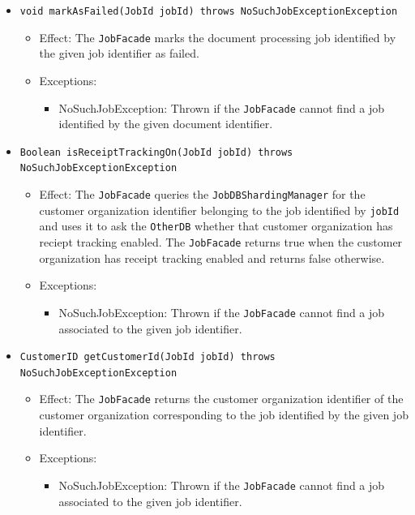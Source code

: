 \documentclass[a4paper,10pt]{article}
\begin{document}
\begin{itemize}
\begin{itemize}
  \item \texttt{void markAsFailed(JobId jobId) throws NoSuchJobExceptionException}
    	\begin{itemize}
    		\item Effect: The \texttt{JobFacade} marks the document processing job identified by the given job identifier as failed.
    		\item Exceptions:
    		\begin{itemize}
    			\item NoSuchJobException: Thrown if the \texttt{JobFacade} cannot find a job identified by the given document identifier.
    		\end{itemize}
    	\end{itemize}     	
    	
    	
    	\item \texttt{Boolean isReceiptTrackingOn(JobId jobId) throws NoSuchJobExceptionException}
    	\begin{itemize}
    		\item Effect: The \texttt{JobFacade} queries the \texttt{JobDBShardingManager} for the customer organization identifier belonging to the job identified by \texttt{jobId} and uses it to ask the \texttt{OtherDB} whether that customer organization has reciept tracking enabled. The \texttt{JobFacade} returns true when the customer organization has receipt tracking enabled and returns false otherwise.
    		\item Exceptions:
    		\begin{itemize}
    			\item NoSuchJobException: Thrown if the \texttt{JobFacade} cannot find a job associated to the given job identifier.
    		\end{itemize}
    	\end{itemize}
 
   	   \item \texttt{CustomerID getCustomerId(JobId jobId) throws NoSuchJobExceptionException}
    	\begin{itemize}
    		\item Effect: The \texttt{JobFacade} returns the customer organization identifier of the customer organization corresponding to the job identified by the given job identifier.
    		\item Exceptions:
    		\begin{itemize}
    			\item NoSuchJobException: Thrown if the \texttt{JobFacade} cannot find a job associated to the given job identifier.
    		\end{itemize}
    	\end{itemize}	 
 

\end{itemize}
\end{itemize}
\end{document}
